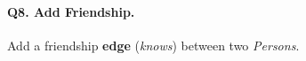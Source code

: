 \paragraph{\textbf{Q8}. Add Friendship.}
Add a friendship \textbf{edge} (\emph{knows}) between two
\emph{Persons}.
